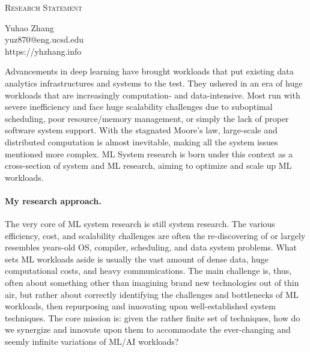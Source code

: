 \documentclass[letterpaper]{article}
\makeatletter
\newcommand{\soptitle}{Research Statement}
\newcommand{\yourname}{Yuhao Zhang}
\newcommand{\youremail}{yuz870@eng.ucsd.edu}
\newcommand{\amper}{{\fontspec[Scale=1]{Adobe Caslon Pro}\selectfont\itshape\&~{}}}
\makeatother
\begin{document}
\begin{center}{\huge \scshape \soptitle}\end{center}
\begin{center}\vspace{0.2em} {\Large \yourname\\}
  {\youremail\\} {https://yhzhang.info}\end{center}

\noindent Advancements in deep learning have brought workloads that put existing data analytics infrastructures and systems to the test. They ushered in an era of huge workloads that are increasingly computation- and data-intensive. Most run with severe inefficiency and face huge scalability challenges due to suboptimal scheduling, poor resource/memory management, or simply the lack of proper software system support. With the stagnated Moore's law, large-scale and distributed computation is almost inevitable, making all the system issues mentioned more complex. ML System research is born under this context as a cross-section of system and ML research, aiming to optimize and scale up ML workloads.

\paragraph{My research approach.} The very core of ML system research is still system research. The various efficiency, cost, and scalability challenges are often the re-discovering of or largely resembles years-old OS, compiler, scheduling, and data system problems. What sets ML workloads aside is usually the vast amount of dense data, huge computational costs, and heavy communications. The main challenge is, thus, often about something other than imagining brand new technologies out of thin air, but rather about correctly identifying the challenges and bottlenecks of ML workloads, then repurposing and innovating upon well-established system techniques. The core mission is: given the rather finite set of techniques, how do we synergize and innovate upon them to accommodate the ever-changing and seemly infinite variations of ML/AI workloads? 
\end{document}
